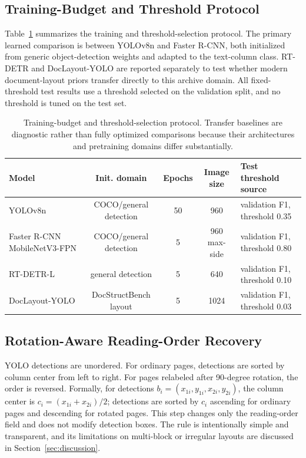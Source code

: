 \documentclass[pdflatex,sn-mathphys-num]{sn-jnl}
\begin{document}
\subsection{Training-Budget and Threshold Protocol}
Table~\ref{tab:training_protocol} summarizes the training and threshold-selection protocol. The primary learned comparison is between YOLOv8n and Faster R-CNN, both initialized from generic object-detection weights and adapted to the text-column class. RT-DETR and DocLayout-YOLO are reported separately to test whether modern document-layout priors transfer directly to this archive domain. All fixed-threshold test results use a threshold selected on the validation split, and no threshold is tuned on the test set.

\begin{table}
\centering
\scriptsize\setlength{\tabcolsep}{3pt}
\caption{Training-budget and threshold-selection protocol. Transfer baselines are diagnostic rather than fully optimized comparisons because their architectures and pretraining domains differ substantially.}
\label{tab:training_protocol}
\begin{tabular}{lcccl}
\toprule
Model & Init. domain & Epochs & Image size & Test threshold source \\
\midrule
YOLOv8n & COCO/general detection & 50 & 960 & validation F1, threshold 0.35 \\
Faster R-CNN MobileNetV3-FPN & COCO/general detection & 5 & 960 max-side & validation F1, threshold 0.80 \\
RT-DETR-L & general detection & 5 & 640 & validation F1, threshold 0.10 \\
DocLayout-YOLO & DocStructBench layout & 5 & 1024 & validation F1, threshold 0.03 \\
\bottomrule
\end{tabular}
\end{table}

\subsection{Rotation-Aware Reading-Order Recovery}
YOLO detections are unordered. For ordinary pages, detections are sorted by column center from left to right. For pages relabeled after 90-degree rotation, the order is reversed. Formally, for detections $b_i=(x_{1i},y_{1i},x_{2i},y_{2i})$, the column center is $c_i=(x_{1i}+x_{2i})/2$; detections are sorted by $c_i$ ascending for ordinary pages and descending for rotated pages. This step changes only the reading-order field and does not modify detection boxes. The rule is intentionally simple and transparent, and its limitations on multi-block or irregular layouts are discussed in Section~\ref{sec:discussion}.
\end{document}
